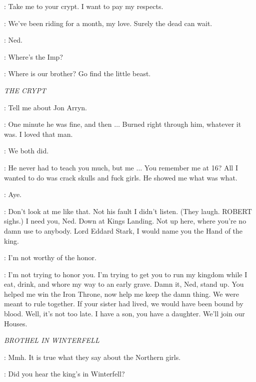 \ROBERT: Take me to your crypt. I want to pay my respects. 

\CERSEI: We've been riding for a month, my love. Surely the dead can wait. 

\ROBERT: Ned. 


\ARYA: Where's the Imp? 


\CERSEI: Where is our brother? Go find the little beast. 


\scene

\textit{THE CRYPT} 


\NED: Tell me about Jon Arryn. 

\ROBERT: One minute he was fine, and then $\ldots$ Burned right through him, whatever it was. I loved that man. 

\NED: We both did. 

\ROBERT: He never had to teach you much, but me $\ldots$ You remember me at 16? All I wanted to do was crack skulls and fuck girls. He showed me what was what. 

\NED: Aye. 

\ROBERT: Don't look at me like that. Not his fault I didn't listen. (They laugh. ROBERT sighs.) I need you, Ned. Down at Kings Landing. Not up here, where you're no damn use to anybody. Lord Eddard Stark, I would name you the Hand of the king. 


\NED: I'm not worthy of the honor. 

\ROBERT: I'm not trying to honor you. I'm trying to get you to run my kingdom while I eat, drink, and whore my way to an early grave. Damn it, Ned, stand up. You helped me win the Iron Throne, now help me keep the damn thing. We were meant to rule together. If your sister had lived, we would have been bound by blood. Well, it's not too late. I have a son, you have a daughter. We'll join our Houses. 


\scene

\textit{BROTHEL IN WINTERFELL} 


\TYRION: Mmh. It is true what they say about the Northern girls. 

\ROS: Did you hear the king's in Winterfell? 

